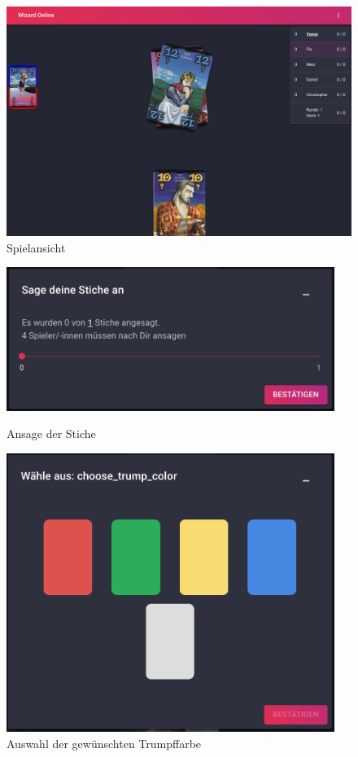 \begin{figure}[h]
	\includegraphics[width=\textwidth]{images/game.png}
	\caption{Spielansicht}
	\label{fig:game-view}
\end{figure}

\begin{figure}[h]
	\begin{minipage}{0.5\textwidth}
		\centering
		\includegraphics[width=0.95\textwidth]{images/trick-selection.png}
		\caption{Ansage der Stiche}
		\label{fig:trick-selection}
	\end{minipage}
	\begin{minipage}{0.5\textwidth}
		\centering
		\includegraphics[width=0.95\textwidth]{images/trick-color-selection.png}
		\caption{Auswahl der gewünschten Trumpffarbe}
		\label{fig:trick-color-selection}
	\end{minipage}
\end{figure}

